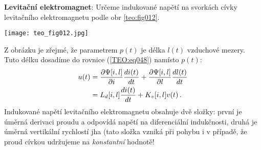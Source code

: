 \begin{example}
  \textbf{Levitační elektromagnet}: Určeme indukované napětí na svorkách cívky levitačního 
  elektromagnetu podle obr \ref{teo:fig012}.
  
   {\centering
    \captionsetup{type=figure}
    \texttt{[image: teo\_fig012.jpg]}
    \label{teo:fig012}
  \par}
  Z obrázku je zřejmé, že parametrem \(p(t)\) je délka \(l(t)\) vzduchové mezery. Tuto délku 
  dosadíme do rovnice (\ref{TEO:eq048}) namísto \( p(t)\):
  \begin{align}\label{TEO:eq076}
    u(t) &= \dfrac{\partial \Psi[i, l]}{\partial i}\dfrac{d i(t)}{d t} + \dfrac{\partial \Psi[i,l]}{\partial l}\dfrac{d l(t)}{d t}  \nonumber \\
         &= L_d[i,l]\dfrac{d i(t)}{d t} + K_v[i,l]v(t)\,.
  \end{align}
  Indukované napětí levitačního elektromagnetu obsahuje dvě složky: první je úměrná derivaci proudu 
  a odpovídá napětí na diferenciální indukčnosti, druhá je úměrná vertikální rychlostí jha (tato 
  složka vzniká při pohybu i v případě, že proud cívkou udržujeme na \emph{konstantní} hodnotě!

\end{example}


